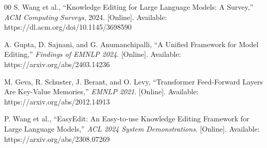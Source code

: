 \documentclass[conference]{IEEEtran}
\begin{document}
\begin{thebibliography}{00}
     S. Wang et al., ``Knowledge Editing for Large Language Models: A Survey,'' \textit{ACM Computing Surveys}, 2024. [Online]. Available: https://dl.acm.org/doi/10.1145/3698590

     A. Gupta, D. Sajnani, and G. Anumanchipalli, ``A Unified Framework for Model Editing,'' \textit{Findings of EMNLP 2024}. [Online]. Available: https://arxiv.org/abs/2403.14236

     M. Geva, R. Schuster, J. Berant, and O. Levy, ``Transformer Feed-Forward Layers Are Key-Value Memories,'' \textit{EMNLP 2021}. [Online]. Available: https://arxiv.org/abs/2012.14913

 P. Wang et al., ``EasyEdit: An Easy-to-use Knowledge Editing Framework for Large Language Models,'' \textit{ACL 2024 System Demonstrations}. [Online]. Available: https://arxiv.org/abs/2308.07269
\end{thebibliography}
\end{document}
